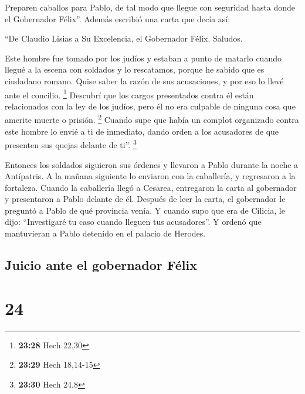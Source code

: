  Preparen caballos para Pablo, de tal modo que llegue con
seguridad hasta donde el Gobernador Félix''.  Además
escribió una carta que decía así:

 ``De Claudio Lisias a Su Excelencia, el Gobernador
Félix. Saludos.

 Este hombre fue tomado por los judíos y estaban a punto
de matarlo cuando llegué a la escena con soldados y lo rescatamos,
porque he sabido que es ciudadano romano.  Quise saber la
razón de sus acusaciones, y por eso lo llevé ante el concilio.
\footnote{\textbf{23:28} Hech 22,30}  Descubrí que los
cargos presentados contra él están relacionados con la ley de los
judíos, pero él no era culpable de ninguna cosa que amerite muerte o
prisión. \footnote{\textbf{23:29} Hech 18,14-15}  Cuando
supe que había un complot organizado contra este hombre lo envié a ti de
inmediato, dando orden a los acusadores de que presenten sus quejas
delante de ti''. \footnote{\textbf{23:30} Hech 24,8}

 Entonces los soldados siguieron sus órdenes y llevaron a
Pablo durante la noche a Antípatris.  A la mañana
siguiente lo enviaron con la caballería, y regresaron a la fortaleza.
 Cuando la caballería llegó a Cesarea, entregaron la
carta al gobernador y presentaron a Pablo delante de él. 
Después de leer la carta, el gobernador le preguntó a Pablo de qué
provincia venía. Y cuando supo que era de Cilicia, le dijo:
 ``Investigaré tu caso cuando lleguen tus acusadores''. Y
ordenó que mantuvieran a Pablo detenido en el palacio de Herodes.

\hypertarget{juicio-ante-el-gobernador-fuxe9lix}{%
\subsection{Juicio ante el gobernador
Félix}\label{juicio-ante-el-gobernador-fuxe9lix}}

\hypertarget{section-23}{%
\section{24}\label{section-23}}

